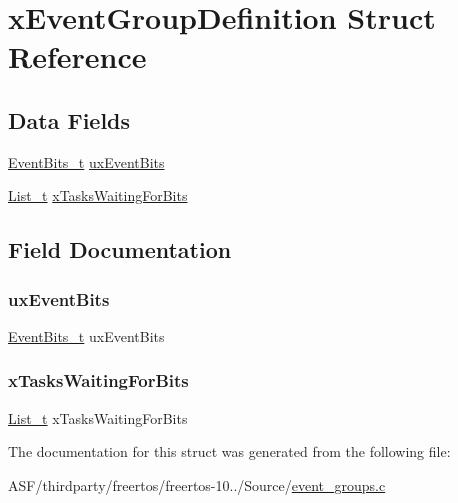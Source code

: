 \hypertarget{structx_event_group_definition}{}\section{x\+Event\+Group\+Definition Struct Reference}
\label{structx_event_group_definition}
\subsection*{Data Fields}
\begin{DoxyCompactItemize}
\item 
\mbox{\hyperlink{event__groups_8h_ab2f21b93db0b2a0ab64d7a81ff32ac2e}{Event\+Bits\+\_\+t}} \mbox{\hyperlink{structx_event_group_definition_a518ab52c1060afbc5ca27d6d904be9e1}{ux\+Event\+Bits}}
\item 
\mbox{\hyperlink{list_8h_afd590ef6400071b4d63d65ef90bea7f4}{List\+\_\+t}} \mbox{\hyperlink{structx_event_group_definition_a3cad6f30679ed2f331cdcac8e0698525}{x\+Tasks\+Waiting\+For\+Bits}}
\end{DoxyCompactItemize}


\subsection{Field Documentation}
\mbox{\label{structx_event_group_definition_a518ab52c1060afbc5ca27d6d904be9e1}} 
\subsubsection{\texorpdfstring{uxEventBits}{uxEventBits}}
{\footnotesize\ttfamily \mbox{\hyperlink{event__groups_8h_ab2f21b93db0b2a0ab64d7a81ff32ac2e}{Event\+Bits\+\_\+t}} ux\+Event\+Bits}

\mbox{\label{structx_event_group_definition_a3cad6f30679ed2f331cdcac8e0698525}} 
\subsubsection{\texorpdfstring{xTasksWaitingForBits}{xTasksWaitingForBits}}
{\footnotesize\ttfamily \mbox{\hyperlink{list_8h_afd590ef6400071b4d63d65ef90bea7f4}{List\+\_\+t}} x\+Tasks\+Waiting\+For\+Bits}



The documentation for this struct was generated from the following file\+:\begin{DoxyCompactItemize}
\item 
A\+S\+F/thirdparty/freertos/freertos-\/10../\+Source/\mbox{\hyperlink{event__groups_8c}{event\+\_\+groups.\+c}}\end{DoxyCompactItemize}
